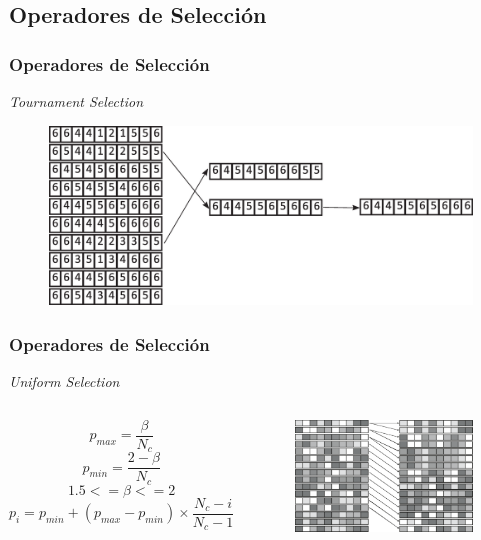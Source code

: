\documentclass[9pt]{beamer}
\begin{document}
    \subsection{Operadores de Selección}
    \begin{frame}
        \frametitle{Operadores de Selección}                       
        \textit{Tournament Selection}
        \begin{figure}
            \includegraphics[width=\textwidth]{assets/Anexo/TournamentSelection.eps}
        \end{figure}
    \end{frame}
    \begin{frame}
        \frametitle{Operadores de Selección}
        \textit{Uniform Selection}
        \begin{columns}
            $$p_{max} = \frac{\beta}{N_c}$$
            $$p_{min} = \frac{2-\beta}{N_c}$$
            $$1.5 <= \beta <= 2$$             
            $$p_{i} = p_{min} + (p_{max} - p_{min}) \times \frac{N_c - i}{N_c - 1}$$                  
        
            \begin{figure}
                \includegraphics[width=\textwidth]{assets/Anexo/UniformSelection.eps}
            \end{figure}
        \end{columns}

    \end{frame}
\end{document}
